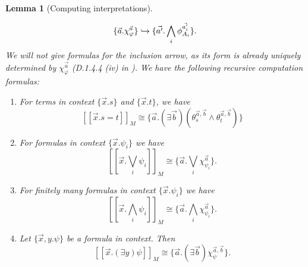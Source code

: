 \documentclass[a4paper]{amsproc}
\theoremstyle{plain}
\newtheorem{lemma}{Lemma}[section]
\theoremstyle{definition}
\theoremstyle{remark}
\numberwithin{equation}{section}
\newcommand{\ldoub}{[\![ }
\newcommand{\rdoub}{]\!]}
\begin{document}
\begin{lemma} [Computing interpretations]
\begin{itemize}
\[
\{\vec{a} . \chi_{\varphi}^{\vec{a}} \} \xhookrightarrow{} \{ \vec{a'} . \bigwedge_i \phi_{A_i}^{\vec{a'_i}}\} .
\]
We will not give formulas for the inclusion arrow, as its form is already uniquely determined by $\chi_{\varphi}^{\vec{a}}$ (D.1.4.4 (iv) in \cite{elephant}). We have the following recursive computation formulas:
\begin{enumerate}
\item For terms in context $\{\vec{x} . s\}$ and $\{\vec{x} . t\}$, we have
\[
\ldoub\vec{x} . s = t \rdoub_M \cong \{\vec{a} . (\exists \vec{b}) (\theta_s^{\vec{a}, \vec{b}} \wedge \theta_t^{\vec{a}, \vec{b}}) \}
\]
\item For formulas in context $\{\vec{x} . \psi_i\}$ we have
\[
\ldoub\vec{x} . \bigvee_i \psi_i \rdoub_M \cong \big \{ \vec{a} . \bigvee_i \chi_{\psi_i}^{\vec{a}} \big \} . 
\]
\item For finitely many formulas in context $\{\vec{x} . \psi_i\}$ we have
\[
\ldoub\vec{x} . \bigwedge_i \psi_i \rdoub_M \cong \big \{ \vec{a} . \bigwedge_i \chi_{\psi_i}^{\vec{a}} \big \} . 
\]
\item Let $\{\vec{x}, y . \psi \}$ be a formula in context. Then
\[
\ldoub\vec{x} . (\exists y) \psi\rdoub_M \cong \{\vec{a} . (\exists \vec{b}) \chi^{\vec{a}, \vec{b}}_{\psi} \} .
\]
\end{enumerate}
\end{itemize}

\end{lemma}
\end{document}
